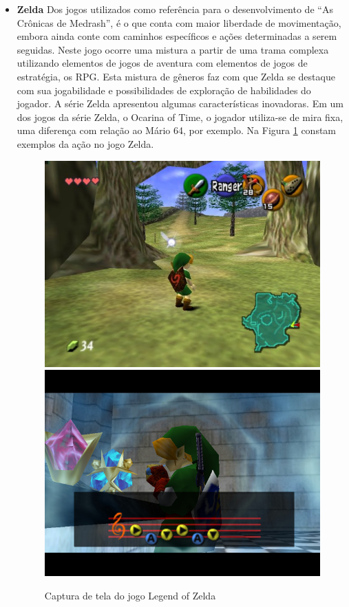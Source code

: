 \begin{itemize}
\item {\bf Zelda}
Dos jogos utilizados como referência para o desenvolvimento de
 ``As Crônicas de Medrash'',
é o que conta com maior liberdade de movimentação, embora ainda conte com 
caminhos específicos e ações determinadas a serem seguidas.
Neste jogo ocorre uma mistura a partir de uma trama complexa utilizando 
elementos de jogos de aventura com elementos de jogos de estratégia, os RPG. 
Esta mistura de gêneros faz com que Zelda se destaque com sua jogabilidade e
 possibilidades de exploração de habilidades do jogador. 
A série Zelda apresentou algumas características inovadoras. Em um dos jogos
 da série Zelda, o Ocarina of Time, o jogador utiliza-se de mira fixa, uma diferença 
com relação ao Mário 64, por exemplo.
Na Figura \ref{img:zelda} constam exemplos da ação no jogo Zelda.

\begin{figure}[!ht]
 \centering
 \includegraphics[scale=0.35]{Imagens/zelda1.png}
 \includegraphics[scale=0.35]{Imagens/zelda2.png}
 \caption{Captura de tela do jogo Legend of Zelda}
 \label{img:zelda}
\end{figure}


\end{itemize}
